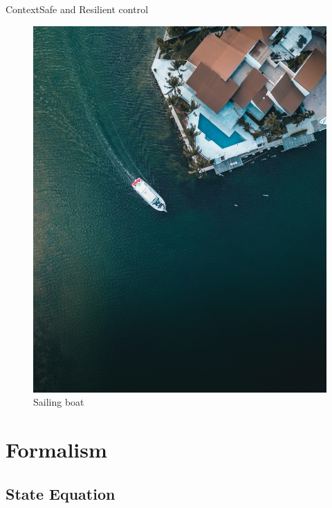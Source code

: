 \documentclass[9pt, xcolor={usenames, dvipsnames}]{beamer}
\begin{document}
\begin{frame}{Context}{Safe and Resilient control}
\begin{minipage}{0.35\textwidth}
\begin{figure}
						\includegraphics[width=\textwidth, trim=100 0 200 0, clip]{images/boat_view.jpg}
						\caption{Sailing boat}
					\end{figure}
				\end{minipage}
			\end{frame}

	\section{Formalism}

		\subsection{State Equation}
\end{document}

